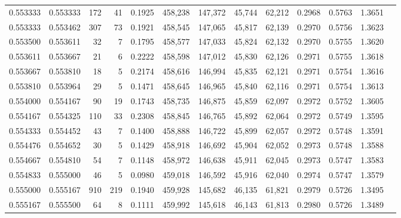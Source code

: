 \begin{tabular}{rrrrrrrrrrrrr}
0.553333 & 0.553333 &   172 &  41 &                                     0.1925 & 458,238 & 147,372 &  45,744 &  62,212 & 0.2968 & 0.5763 & 1.3651 \\
0.553333 & 0.553462 &   307 &  73 &                                     0.1921 & 458,545 & 147,065 &  45,817 &  62,139 & 0.2970 & 0.5756 & 1.3623 \\
0.553500 & 0.553611 &    32 &   7 &                                     0.1795 & 458,577 & 147,033 &  45,824 &  62,132 & 0.2970 & 0.5755 & 1.3620 \\
0.553611 & 0.553667 &    21 &   6 &                                     0.2222 & 458,598 & 147,012 &  45,830 &  62,126 & 0.2971 & 0.5755 & 1.3618 \\
0.553667 & 0.553810 &    18 &   5 &                                     0.2174 & 458,616 & 146,994 &  45,835 &  62,121 & 0.2971 & 0.5754 & 1.3616 \\
0.553810 & 0.553964 &    29 &   5 &                                     0.1471 & 458,645 & 146,965 &  45,840 &  62,116 & 0.2971 & 0.5754 & 1.3613 \\
0.554000 & 0.554167 &    90 &  19 &                                     0.1743 & 458,735 & 146,875 &  45,859 &  62,097 & 0.2972 & 0.5752 & 1.3605 \\
0.554167 & 0.554325 &   110 &  33 &                                     0.2308 & 458,845 & 146,765 &  45,892 &  62,064 & 0.2972 & 0.5749 & 1.3595 \\
0.554333 & 0.554452 &    43 &   7 &                                     0.1400 & 458,888 & 146,722 &  45,899 &  62,057 & 0.2972 & 0.5748 & 1.3591 \\
0.554476 & 0.554652 &    30 &   5 &                                     0.1429 & 458,918 & 146,692 &  45,904 &  62,052 & 0.2973 & 0.5748 & 1.3588 \\
0.554667 & 0.554810 &    54 &   7 &                                     0.1148 & 458,972 & 146,638 &  45,911 &  62,045 & 0.2973 & 0.5747 & 1.3583 \\
0.554833 & 0.555000 &    46 &   5 &                                     0.0980 & 459,018 & 146,592 &  45,916 &  62,040 & 0.2974 & 0.5747 & 1.3579 \\
0.555000 & 0.555167 &   910 & 219 &                                     0.1940 & 459,928 & 145,682 &  46,135 &  61,821 & 0.2979 & 0.5726 & 1.3495 \\
0.555167 & 0.555500 &    64 &   8 &                                     0.1111 & 459,992 & 145,618 &  46,143 &  61,813 & 0.2980 & 0.5726 & 1.3489 \\

\end{tabular}
